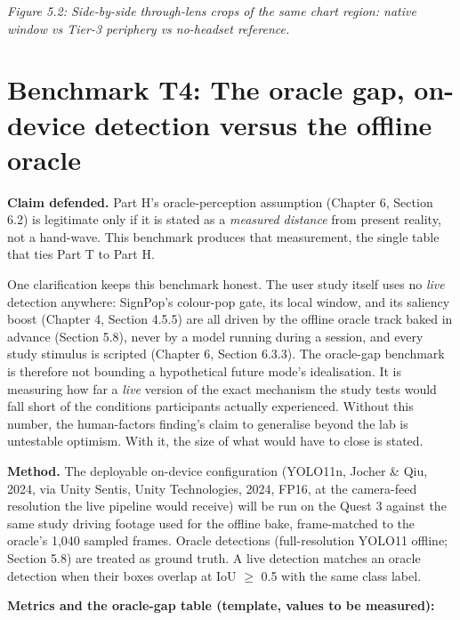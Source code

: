 \textit{Figure 5.2: Side-by-side through-lens crops of the same chart region: native window vs Tier-3
periphery vs no-headset reference.}

\section{Benchmark T4: The oracle gap, on-device detection versus the offline oracle}

\textbf{Claim defended.} Part H's oracle-perception assumption (Chapter 6, Section 6.2) is legitimate
only if it is stated as a \textit{measured distance} from present reality, not a hand-wave. This benchmark
produces that measurement, the single table that ties Part T to Part H.

One clarification keeps this benchmark honest. The user study itself uses no \textit{live} detection
anywhere: SignPop's colour-pop gate, its local window, and its saliency boost (Chapter 4, Section
4.5.5) are all driven by the offline oracle track baked in advance (Section 5.8), never by a model
running during a session, and every study stimulus is scripted (Chapter 6, Section 6.3.3). The
oracle-gap benchmark is therefore not bounding a hypothetical future mode's idealisation. It is
measuring how far a \textit{live} version of the exact mechanism the study tests would fall short of
the conditions participants actually experienced. Without this number, the human-factors finding's
claim to generalise beyond the lab is untestable optimism. With it, the size of what would have to
close is stated.

\textbf{Method.} The deployable on-device configuration (YOLO11n, Jocher \& Qiu, 2024, via Unity Sentis, Unity Technologies, 2024, FP16, at the
camera-feed resolution the live pipeline would receive) will be run on the Quest 3 against the same
study driving footage used for the offline bake, frame-matched to the oracle's 1,040 sampled
frames. Oracle detections (full-resolution YOLO11 offline; Section 5.8) are treated as ground
truth. A live detection matches an oracle detection when their boxes overlap at IoU $\geq$ 0.5 with the
same class label.

\textbf{Metrics and the oracle-gap table (template, values to be measured):}

